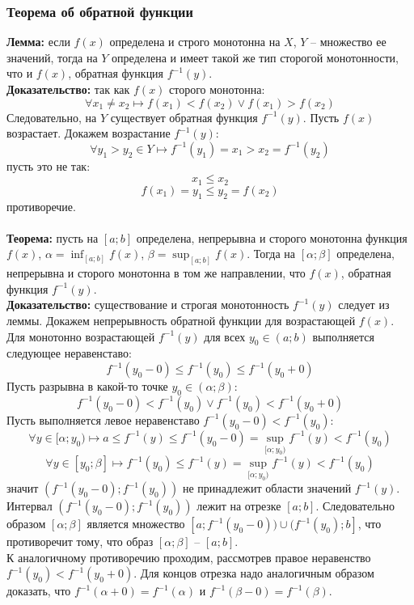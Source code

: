 \documentclass{article}
\newcommand{\theorem}{\textbf{Теорема:} }
\newcommand{\lemma}{\textbf{Лемма:} }
\newcommand{\proof}{\textbf{Доказательство:} }
\newcommand{\intr}[2]{$(#1;#2)$}
\newcommand{\otr}[2]{$[#1;#2]$}
\begin{document}
        \subsubsection*{Теорема об обратной функции}
        \lemma если $f(x)$ определена и строго монотонна на $X$, $Y$ -- множество ее значений, тогда на $Y$ определена и имеет такой
        же тип сторогой монотонности, что и $f(x)$, обратная функция $f^{-1}(y)$.
        \\
        \proof так как $f(x)$ сторого монотонна:
        \[ \forall x_1 \ne x_2 \longmapsto f(x_1) < f(x_2) \lor f(x_1) > f(x_2)\]
        Следовательно, на $Y$ существует обратная функция $f^{-1}(y)$. Пусть $f(x)$ возрастает. Докажем возрастание $f^{-1}(y)$:
        \[ \forall y_1 > y_2 \in Y \longmapsto f^{-1}(y_1) = x_1 > x_2 = f^{-1}(y_2) \]
        пусть это не так:
        \[ x_1 \le x_2 \]
        \[ f(x_1) = y_1 \le y_2 = f(x_2) \]
        противоречие.
        \\
        \\
        \theorem пусть на \otr{a}{b} определена, непрерывна и сторого монотонна функция $f(x)$, $\alpha = \inf_{[a;b]} f(x)$, $\beta = \sup_{[a;b]} f(x)$.
        Тогда на \otr{\alpha}{\beta} определена, непрерывна и сторого монотонна в том же направлении, что $f(x)$, обратная функция $f^{-1}(y)$.
        \\
        \proof существование и строгая монотонность $f^{-1}(y)$ следует из леммы. Докажем непрерывность обратной функции для возрастающей $f(x)$.
        Для монотонно возрастающей $f^{-1}(y)$ для всех $y_0 \in (a; b)$ выполняется следующее неравенставо:
        \[ f^{-1}(y_0 - 0) \le f^{-1}(y_0) \le f^{-1}(y_0 + 0) \]
        Пусть разрывна в какой-то точке $y_0 \in (\alpha; \beta)$:
        \[ f^{-1}(y_0 - 0) < f^{-1}(y_0) \lor f^{-1}(y_0) < f^{-1}(y_0 + 0) \]
        Пусть выполняется левое неравенставо $f^{-1}(y_0 - 0) < f^{-1}(y_0)$:
        \[ \forall y \in [\alpha; y_0) \longmapsto a \le f^{-1}(y) \le f^{-1}(y_0 - 0) = \sup_{[\alpha; y_0)} f^{-1}(y) < f^{-1}(y_0) \]
        \[ \forall y \in [y_0; \beta] \longmapsto f^{-1}(y_0) \le f^{-1}(y) = \sup_{[\alpha; y_0)} f^{-1}(y) < f^{-1}(y_0) \]
        значит \intr{f^{-1}(y_0 - 0)}{f^{-1}(y_0)} не принадлежит области значений $f^{-1}(y)$.
        Интервал \intr{f^{-1}(y_0 - 0)}{f^{-1}(y_0)} лежит на отрезке \otr{a}{b}.
        Следовательно образом \otr{\alpha}{\beta} является множество $[a;f^{-1}(y_0 - 0)) \cup (f^{-1}(y_0); b]$, что противоречит тому,
        что образ \otr{\alpha}{\beta} -- \otr{a}{b}.
        \\
        К аналогичному противоречию проходим, рассмотрев правое неравенство $f^{-1}(y_0) < f^{-1}(y_0 + 0)$.
        Для концов отрезка надо аналогичным образом доказать, что $f^{-1}(\alpha + 0) = f^{-1}(\alpha)$ и $f^{-1}(\beta - 0) = f^{-1}(\beta)$.
        
\end{document}
